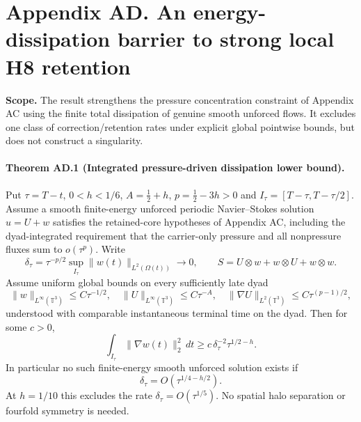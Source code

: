 \clearpage
\section*{Appendix AD. An energy-dissipation barrier to strong local H8 retention}
\noindent\textbf{Scope.} The result strengthens the pressure concentration constraint of Appendix AC using the finite total dissipation of genuine smooth unforced flows. It excludes one class of correction/retention rates under explicit global pointwise bounds, but does not construct a singularity.

\paragraph{Theorem AD.1 (Integrated pressure-driven dissipation lower bound).}
Put $\tau=T-t$, $0<h<1/6$, $A=\frac12+h$, $p=\frac12-3h>0$ and $I_\tau=[T-\tau,T-\tau/2]$. Assume a smooth finite-energy unforced periodic Navier--Stokes solution $u=U+w$ satisfies the retained-core hypotheses of Appendix AC, including the dyad-integrated requirement that the carrier-only pressure and all nonpressure fluxes sum to $o(\tau^p)$. Write
\[
 \delta_\tau=\tau^{-p/2}\sup_{I_\tau}\|w(t)\|_{L^2(\Omega(t))}\to0,\qquad S=U\otimes w+w\otimes U+w\otimes w.
\]
Assume uniform global bounds on every sufficiently late dyad
\[
 \|w\|_{L^\infty(\mathbb T^3)}\le C\tau^{-1/2},\quad
 \|U\|_{L^\infty(\mathbb T^3)}\le C\tau^{-A},\quad
 \|\nabla U\|_{L^2(\mathbb T^3)}\le C\tau^{(p-1)/2},
\]
understood with comparable instantaneous terminal time on the dyad. Then for some $c>0$,
\begin{equation}\label{eq:AD-dissipation}
 \boxed{\int_{I_\tau}\|\nabla w(t)\|_2^2\,dt\ge
 c\,\delta_\tau^{-2}\tau^{1/2-h}.}
\end{equation}
In particular no such finite-energy smooth unforced solution exists if
\begin{equation}\label{eq:AD-rate}
 \boxed{\delta_\tau=O(\tau^{1/4-h/2}).}
\end{equation}
At $h=1/10$ this excludes the rate $\delta_\tau=O(\tau^{1/5})$. No spatial halo separation or fourfold symmetry is needed.

